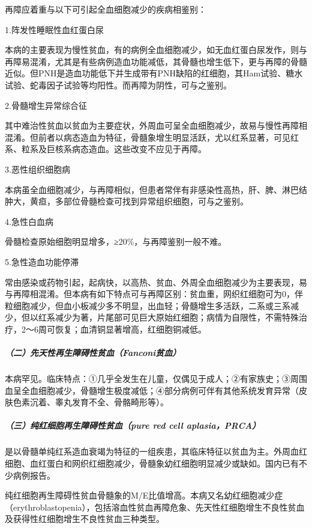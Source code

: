 再障应着重与以下可引起全血细胞减少的疾病相鉴别：

\hypertarget{text00261.htmlux5cux23CHP33-6-3-4-7-1-1}{}
1.阵发性睡眠性血红蛋白尿

本病的主要表现为慢性贫血，有的病例全血细胞减少，如无血红蛋白尿发作，则与再障易混淆，尤其是有些病例造血功能减低，其骨髓也增生低下，更与再障的骨髓近似。但PNH是造血功能低下并生成带有PNH缺陷的红细胞，其Ham试验、糖水试验、蛇毒因子试验等均阳性。而再障为阴性，可与之鉴别。

\hypertarget{text00261.htmlux5cux23CHP33-6-3-4-7-1-2}{}
2.骨髓增生异常综合征

其中难治性贫血以贫血为主要症状，外周血可呈全血细胞减少，故易与慢性再障相混淆。但前者以病态造血为特征，骨髓象增生明显活跃，尤以红系显著，可见红系、粒系及巨核系病态造血。这些改变不应见于再障。

\hypertarget{text00261.htmlux5cux23CHP33-6-3-4-7-1-3}{}
3.恶性组织细胞病

本病虽全血细胞减少，与再障相似，但患者常伴有非感染性高热，肝、脾、淋巴结肿大，黄疸，多部位骨髓检查可找到异常组织细胞，可与之鉴别。

\hypertarget{text00261.htmlux5cux23CHP33-6-3-4-7-1-4}{}
4.急性白血病

骨髓检查原始细胞明显增多，≥20\%，与再障鉴别一般不难。

\hypertarget{text00261.htmlux5cux23CHP33-6-3-4-7-1-5}{}
5.急性造血功能停滞

常由感染或药物引起，起病快，以高热、贫血、外周全血细胞减少为主要表现，易与再障相混淆。但本病有如下特点可与再障区别：贫血重，网织红细胞可为0，伴粒细胞减少，但血小板减少多不明显，出血轻；骨髓增生多活跃，二系或三系减少，但以红系减少为著，片尾部可见巨大原始红细胞；病情为自限性，不需特殊治疗，2～6周可恢复；血清铜显著增高，红细胞铜减低。

\subparagraph{（二）先天性再生障碍性贫血（Fanconi贫血）}

本病罕见。临床特点：①几乎全发生在儿童，仅偶见于成人；②有家族史；③周围血呈全血细胞减少，骨髓增生极度减低；④部分病例可伴有其他系统发育异常（皮肤色素沉着、睾丸发育不全、骨骼畸形等）。

\subparagraph{（三）纯红细胞再生障碍性贫血（pure red cell aplasia，PRCA）}

是以骨髓单纯红系造血衰竭为特征的一组疾患，其临床特征以贫血为主。外周血红细胞、血红蛋白和网织红细胞减少，骨髓象幼红细胞明显减少或缺如。国内已有不少病例报告。

纯红细胞再生障碍性贫血骨髓象的M/E比值增高。本病又名幼红细胞减少症（erythroblastopenia），包括溶血性贫血再障危象、先天性红细胞增生不良性贫血及获得性红细胞增生不良性贫血三种类型。

